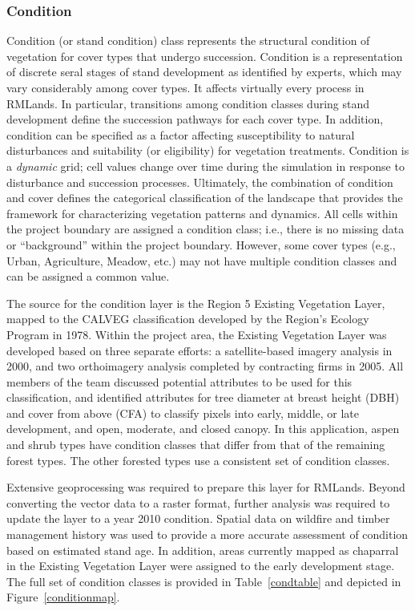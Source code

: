 \subsubsection{Condition}
Condition (or stand condition) class represents the structural condition of vegetation for cover types that undergo succession. Condition is a representation of discrete seral stages of stand development as identified by experts, which may vary considerably among cover types. It affects virtually every process in RMLands. In particular, transitions among condition classes during stand development define the succession pathways for each cover type. In addition, condition can be specified as a factor affecting susceptibility to natural disturbances and suitability (or eligibility) for vegetation treatments. Condition is a \emph{dynamic} grid; cell values change over time during the simulation in response to disturbance and succession processes. Ultimately, the combination of condition and cover defines the categorical classification of the landscape that provides the framework for characterizing vegetation patterns and dynamics. All cells within the project boundary are assigned a condition class; i.e., there is no missing data or ``background'' within the project boundary. However, some cover types (e.g., Urban, Agriculture, Meadow, etc.) may not have multiple condition classes and can be assigned a common value.

The source for the condition layer is the Region 5 Existing Vegetation Layer, mapped to the CALVEG classification developed by the Region's Ecology Program in 1978. Within the project area, the Existing Vegetation Layer was developed based on three separate efforts: a satellite-based imagery analysis in 2000, and two orthoimagery analysis completed by contracting firms in 2005. All members of the team discussed potential attributes to be used for this classification, and identified attributes for tree diameter at breast height (DBH) and cover from above (CFA) to classify pixels into early, middle, or late development, and open, moderate, and closed canopy. In this application, aspen and shrub types have condition classes that differ from that of the remaining forest types. The other forested types use a consistent set of condition classes.

Extensive geoprocessing was required to prepare this layer for RMLands. Beyond converting the vector data to a raster format, further analysis was required to update the layer to a year 2010 condition. Spatial data on wildfire and timber management history was used to provide a more accurate assessment of condition based on estimated stand age. In addition, areas currently mapped as chaparral in the Existing Vegetation Layer were assigned to the early development stage. The full set of condition classes is provided in Table~\ref{condtable} and depicted in Figure~\ref{conditionmap}.

